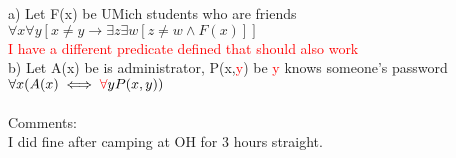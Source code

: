 \documentclass[12pt]{exam}
\begin{document}
\begin{solution}
 a) Let F(x) be UMich students who are friends
 \\$\forall x \forall y [x \neq y \rightarrow \exists z \exists w[z \neq w \land F(x)] ]$\\
\textcolor{red} {I have a different predicate defined that should also work}
\\b) Let A(x) be is administrator, P(x,\textcolor{red}{y}) be \textcolor{red}{y} knows someone's password\\
$\forall x(A(x)\iff \textcolor{red} \forall y P(x,y))$
\\\\Comments:\\
I did fine after camping at OH for 3 hours straight.
\end{solution}
\end{document}
